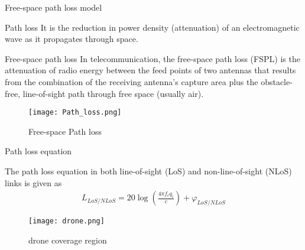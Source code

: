 \documentclass{beamer}
\begin{document}
\begin{frame}{Free-space path loss model}
\begin{block}{Path loss}
 It  is the reduction in power density (attenuation) of an electromagnetic wave as it propagates through space.
\end{block}
\begin{block}{Free-space path loss}
In telecommunication, the free-space path loss (FSPL) is the attenuation of radio energy between the feed points of two antennas that results from the combination of the receiving antenna's capture area plus the obstacle-free, line-of-sight path through free space (usually air).
\end{block}
\end{frame}
\begin{frame}{}
    \begin{figure}[h!]
    \centering
    \texttt{[image: Path\_loss.png]}
    \caption{Free-space Path loss}
    \label{fig:Path_loss}
   \end{figure}
\end{frame}
\begin{frame}{Path loss equation}
\begin{block}{}
The path loss equation in both line-of-sight (LoS) and non-line-of-sight (NLoS) links is given as
    \begin{align}
        L_{LoS/NLoS}=20\log\left(\frac{4\pi f_c q_i}{c}\right) + \varphi_{LoS/NLoS}
    \end{align}
\end{block}

    \begin{figure}[h!]
    \centering
    \texttt{[image: drone.png]}
    \caption{drone coverage region}
    \label{fig:drone}
   \end{figure}

\end{frame}
\end{document}
